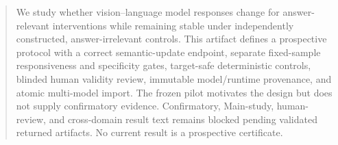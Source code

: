 \begin{abstract}
We study whether vision--language model responses change for answer-relevant interventions while
remaining stable under independently constructed, answer-irrelevant controls. This artifact defines
a prospective protocol with a correct semantic-update endpoint, separate fixed-sample responsiveness
and specificity gates, target-safe deterministic controls, blinded
human validity review, immutable model/runtime provenance, and atomic multi-model import. The frozen
pilot motivates the design but does not supply confirmatory evidence. Confirmatory, Main-study,
human-review, and cross-domain result text remains blocked pending validated returned artifacts. No
current result is a prospective certificate.
\end{abstract}
